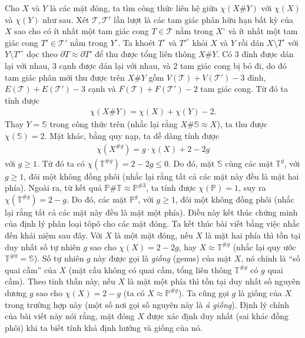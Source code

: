 \begin{multicols}{2}
	\vskip 0.1cm
	Cho $X$ và $Y$ là các mặt đóng, ta tìm công thức liên hệ giữa $\chi(X \# Y)$ với $\chi(X)$ và $\chi(Y)$ như sau. Xét $\mathscr{T},\mathscr{T}'$ lần lượt là các tam giác phân hữu hạn bất kỳ của $X$ sao cho có ít nhất một tam giác cong $T \in \mathscr{T}$ nằm trong $X^\circ$ và ít nhất một tam giác cong $T' \in \mathscr{T}'$ nằm trong $Y^\circ$. Ta khoét $T^{\circ}$ và $T'^{\circ}$ khỏi $X$ và $Y$ rồi dán $X \setminus T^\circ$ với $Y \setminus T'^{\circ}$ dọc theo $\partial T \approx \partial T'$ để thu được tổng liên thông $X \# Y$. Có $3$ đỉnh được dán lại với nhau, $3$ cạnh được dán lại với nhau, và $2$ tam giác cong bị bỏ đi, do đó tam giác phân mới thu được trên $X\#Y$ gồm $V(\mathscr{T}) + V(\mathscr{T}') - 3$ đỉnh, $E(\mathscr{T}) + E(\mathscr{T}') - 3$ cạnh và $F(\mathscr{T}) + F(\mathscr{T}') - 2$ tam giác cong. Từ đó ta tính được
	\begin{align*}
		\chi(X \# Y) = \chi(X) + \chi(Y) - 2.
	\end{align*}
	Thay $Y = \mathbb{S}$ trong công thức trên (nhắc lại rằng $X \# \mathbb{S} \approx X$), ta thu được $\chi(\mathbb{S}) = 2$. Mặt khác, bằng quy nạp, ta dễ dàng tính được
	\begin{align*}
		\chi(X^{\# g}) = g \cdot \chi(X) + 2 - 2g
	\end{align*}
	với $g \ge 1$. Từ đó ta có $\chi(\mathbb{T}^{\# g}) = 2-2g \le 0$. Do đó, mặt $\mathbb{S}$ cùng các mặt $\mathbb{T}^g$, với $g \ge 1$, đôi một không đồng phôi (nhắc lại rằng tất cả các mặt này đều là mặt hai phía).
	\vskip 0.1cm
	Ngoài ra, từ kết quả $\mathbb{P} \# \mathbb{T} \approx \mathbb{P}^{\# 3}$, ta tính được $\chi(\mathbb{P}) = 1$, suy ra $\chi(\mathbb{T}^{\# g}) = 2-g$. Do đó, các mặt $\mathbb{P}^g$, với $g \ge 1$, đôi một không đồng phôi (nhắc lại rằng tất cả các mặt này đều là mặt một phía). Điều này kết thúc chứng minh của định lý phân loại tôpô cho các mặt đóng.
	\vskip 0.1cm
	Ta kết thúc bài viết bằng việc nhắc đến khái niệm sau đây. Với $X$ là một mặt đóng, nếu $X$ là mặt hai phía thì tồn tại duy nhất số tự nhiên $g$ sao cho $\chi(X) = 2-2g$, hay $X \approx \mathbb{T}^{\#g}$ (nhắc lại quy ước $\mathbb{T}^{\# 0} = \mathbb{S}$). Số tự nhiên $g$ này được gọi là {\it giống} (genus) của mặt $X$, nó chính là ``số quai cầm'' của $X$ (mặt cầu không có quai cầm, tổng liên thông $\mathbb{T}^{\# g}$ có $g$ quai cầm). Theo tinh thần này, nếu $X$ là mặt một phía thì tồn tại duy nhất số nguyên dương $g$ sao cho $\chi(X) = 2-g$ (ta có $X \approx \mathbb{P}^{\# g}$). Ta cũng gọi $g$ là giống của $X$ trong trường hợp này (một số nơi gọi số nguyên này là {\it á giống}). Định lý chính của bài viết này nói rằng, mặt đóng $X$ được xác định duy nhất (sai khác đồng phôi) khi ta biết tính khả định hướng và giống của nó.
\end{multicols}